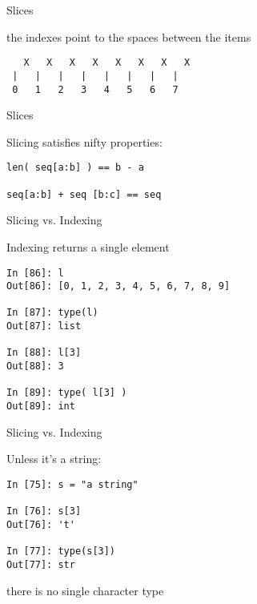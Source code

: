 \documentclass{beamer}
\begin{document}
\begin{frame}[fragile]{Slices}

{\Large the indexes point to the spaces between the items}

\vfill
\begin{verbatim}
   X   X   X   X   X   X   X   X
 |   |   |   |   |   |   |   | 
 0   1   2   3   4   5   6   7
\end{verbatim}

\end{frame}

\begin{frame}[fragile]{Slices}

{\Large Slicing satisfies nifty properties:

\vfill
\begin{verbatim}
len( seq[a:b] ) == b - a

seq[a:b] + seq [b:c] == seq

\end{verbatim}

}

\end{frame}

\begin{frame}[fragile]{Slicing vs. Indexing}

Indexing returns a single element

\begin{verbatim}
In [86]: l
Out[86]: [0, 1, 2, 3, 4, 5, 6, 7, 8, 9]

In [87]: type(l)
Out[87]: list

In [88]: l[3]
Out[88]: 3

In [89]: type( l[3] )
Out[89]: int
\end{verbatim}
\end{frame}

\begin{frame}[fragile]{Slicing vs. Indexing}

Unless it's a string:

\begin{verbatim}
In [75]: s = "a string"

In [76]: s[3]
Out[76]: 't'

In [77]: type(s[3])
Out[77]: str
\end{verbatim}

there is no single character type

\end{frame}
\end{document}
